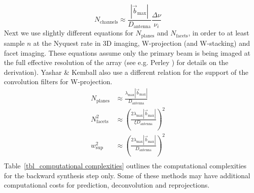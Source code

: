 \begin{equation}
 N_{\text{channels}} \approx \frac{|\vec{b}_{\text{max}}|}{D_{\text{antenna}}}\frac{\Delta{\nu}}{\nu_i}
\end{equation}
Next we use slightly different equations for $N_\text{planes}$ and $N_\text{facets}$, in order to at least sample $n$ at the Nyquest rate in 3D imaging, W-projection (and W-stacking) and facet imaging. 
These equations assume only the primary beam is being imaged at the full effective resolution of the array (see e.g. Perley \cite[Lecture 19]{taylor1999synthesis}) for details on the derivation). 
Yashar \& Kemball \cite{yashar2009tdp} also use a different relation for the support of the convolution filters for W-projection.
\begin{equation}
 \begin{split}
  N_\text{planes} &\approx \frac{\lambda_{\text{max}}|\vec{b}_{\text{max}}|}{D_{\text{antenna}}}\\
  N_\text{facets}^2 &\approx \left(\frac{2\lambda_{\text{max}}|\vec{b}_{\text{max}}|}{\xi D_{\text{antenna}}}\right)^2\\
  w_\text{sup}^2 &\approx \left(\frac{2\lambda_{\text{max}}|\vec{b}_{\text{max}}|}{D_{\text{antenna}}}\right)^2\\
 \end{split}
\end{equation}
Table~\ref{tbl_computational complexities} outlines the computational complexities for the backward synthesis step only. Some of these methods may have additional computational costs for prediction, deconvolution and reprojections.
